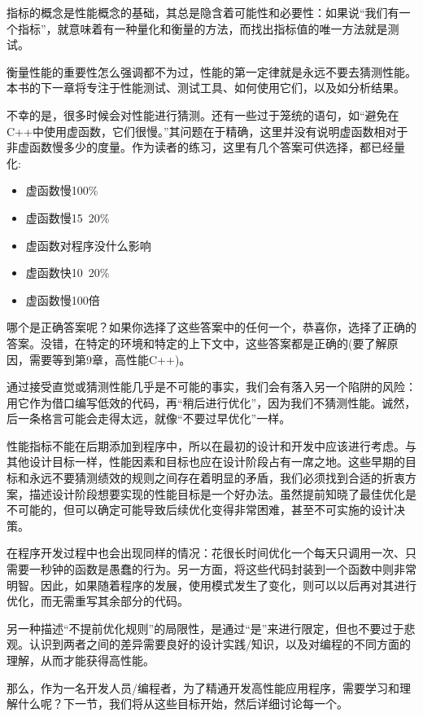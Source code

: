 指标的概念是性能概念的基础，其总是隐含着可能性和必要性：如果说“我们有一个指标”，就意味着有一种量化和衡量的方法，而找出指标值的唯一方法就是测试。

衡量性能的重要性怎么强调都不为过，性能的第一定律就是永远不要去猜测性能。本书的下一章将专注于性能测试、测试工具、如何使用它们，以及如分析结果。

不幸的是，很多时候会对性能进行猜测。还有一些过于笼统的语句，如“避免在C++中使用虚函数，它们很慢。”其问题在于精确，这里并没有说明虚函数相对于非虚函数慢多少的度量。作为读者的练习，这里有几个答案可供选择，都已经量化:

\begin{itemize}
\item 虚函数慢100\%
\item 虚函数慢15~20\%
\item 虚函数对程序没什么影响
\item 虚函数快10~20\%
\item 虚函数慢100倍
\end{itemize}

哪个是正确答案呢？如果你选择了这些答案中的任何一个，恭喜你，选择了正确的答案。没错，在特定的环境和特定的上下文中，这些答案都是正确的(要了解原因，需要等到第9章，高性能C++)。

通过接受直觉或猜测性能几乎是不可能的事实，我们会有落入另一个陷阱的风险：用它作为借口编写低效的代码，再“稍后进行优化”，因为我们不猜测性能。诚然，后一条格言可能会走得太远，就像“不要过早优化”一样。

性能指标不能在后期添加到程序中，所以在最初的设计和开发中应该进行考虑。与其他设计目标一样，性能因素和目标也应在设计阶段占有一席之地。这些早期的目标和永远不要猜测绩效的规则之间存在着明显的矛盾，我们必须找到合适的折衷方案，描述设计阶段想要实现的性能目标是一个好办法。虽然提前知晓了最佳优化是不可能的，但可以确定可能导致后续优化变得非常困难，甚至不可实施的设计决策。

在程序开发过程中也会出现同样的情况：花很长时间优化一个每天只调用一次、只需要一秒钟的函数是愚蠢的行为。另一方面，将这些代码封装到一个函数中则非常明智。因此，如果随着程序的发展，使用模式发生了变化，则可以以后再对其进行优化，而无需重写其余部分的代码。

另一种描述“不提前优化规则”的局限性，是通过“是”来进行限定，但也不要过于悲观。认识到两者之间的差异需要良好的设计实践/知识，以及对编程的不同方面的理解，从而才能获得高性能。

那么，作为一名开发人员/编程者，为了精通开发高性能应用程序，需要学习和理解什么呢？下一节，我们将从这些目标开始，然后详细讨论每一个。
















